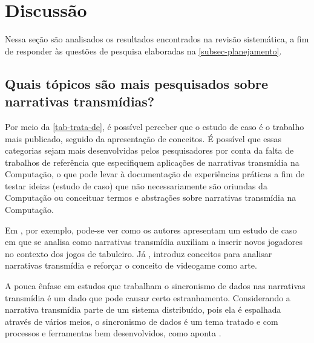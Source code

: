 \documentclass[
article,			%
11pt,				%
oneside,			%
a4paper,			%
english,			%
brazil,				%
sumario=tradicional
]{abntex2}
\begin{document}
  \section{Discussão}
  \label{sec-discussao}

  Nessa seção são analisados os resultados encontrados na revisão sistemática, a fim de responder às questões de pesquisa elaboradas na \autoref{subsec-planejamento}.

  \subsection{Quais tópicos são mais pesquisados sobre narrativas transmídias?}

  Por meio da \autoref{tab-trata-de}, é possível perceber que o estudo de caso é o trabalho mais publicado, seguido da apresentação de conceitos. É possível que essas categorias sejam mais desenvolvidas pelos pesquisadores por conta da falta de trabalhos de referência que especifiquem aplicações de narrativas transmídia na Computação, o que pode levar à documentação de experiências práticas a fim de testar ideias (estudo de caso) que não necessariamente são oriundas da Computação ou conceituar termos e abstrações sobre narrativas transmídia na Computação.

  Em , por exemplo, pode-se ver como os autores apresentam um estudo de caso em que se analisa como narrativas transmídia auxiliam a inserir novos jogadores no contexto dos jogos de tabuleiro. Já , introduz conceitos para analisar narrativas transmídia e reforçar o conceito de videogame como arte.

  A pouca ênfase em estudos que trabalham o sincronismo de dados nas narrativas transmídia é um dado que pode causar certo estranhamento. Considerando a narrativa transmídia parte de um sistema distribuído, pois ela é espalhada através de vários meios, o sincronismo de dados é um tema tratado e com processos e ferramentas bem desenvolvidos, como aponta .
\end{document}
